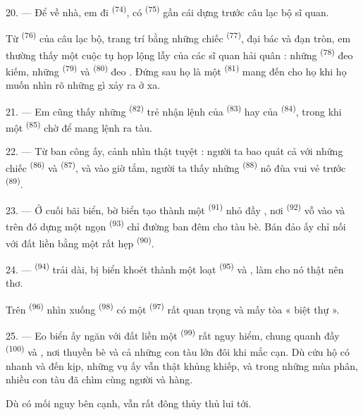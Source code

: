 \VUsaut{3.0mm}
\VUsaut{3.0mm}

20. --- Để về nhà, em đi  \textsuperscript{(74)}, có 
\textsuperscript{(75)} gần cái  dựng trước câu lạc bộ sĩ quan.

Từ  \textsuperscript{(76)} của câu lạc bộ, trang trí bằng những chiếc
 \textsuperscript{(77)}, đại bác và đạn tròn, em thường thấy một cuộc tụ
họp lộng lẫy của các sĩ quan hải quân : những 
\textsuperscript{(78)} đeo kiếm, những 
\textsuperscript{(79)} và  \textsuperscript{(80)} đeo .
Đứng sau họ là một  \textsuperscript{(81)} mang  đến
cho họ khi họ muốn nhìn rõ những gì xảy ra ở xa.

21. --- Em cũng thấy những  \textsuperscript{(82)} trẻ nhận lệnh của
 \textsuperscript{(83)} hay của 
\textsuperscript{(84)}, trong khi một  \textsuperscript{(85)} chờ để
mang lệnh ra tàu.

22. --- Từ ban công ấy, cảnh nhìn thật tuyệt : người ta bao quát cả 
với những chiếc  \textsuperscript{(86)} và 
\textsuperscript{(87)}, và vào giờ tắm, người ta thấy những 
\textsuperscript{(88)} nô đùa vui vẻ trước  \textsuperscript{(89)}.

23. --- Ở cuối bãi biển, bờ biển tạo thành một 
\textsuperscript{(91)} nhỏ đầy , nơi  \textsuperscript{(92)}
vỗ vào và trên đó dựng một ngọn  \textsuperscript{(93)} chỉ đường ban
đêm cho tàu bè. Bán đảo ấy chỉ nối với đất liền bằng một  rất hẹp
\textsuperscript{(90)}.

\VUsaut{3.0mm}
\VUsaut{3.0mm}

24. ---  \textsuperscript{(94)} trải dài, bị biển khoét thành một loạt
 \textsuperscript{(95)} và , làm cho nó thật nên thơ.

Trên  \textsuperscript{(96)} nhìn xuống 
\textsuperscript{(98)} có một  \textsuperscript{(97)} rất quan trọng và
mấy tòa « biệt thự ».

25. --- Eo biển ấy ngăn với đất liền một  \textsuperscript{(99)} rất
nguy hiểm, chung quanh đầy  \textsuperscript{(100)} và , nơi thuyền bè và cả những con tàu lớn đôi khi mắc cạn. Dù cứu hộ có nhanh và
 đến kịp, những vụ  ấy vẫn thật khủng khiếp, và
trong những  mùa phân, nhiều con tàu đã chìm cùng người và hàng.

Dù có mối nguy bên cạnh,  vẫn rất đông thủy thủ lui tới.
\VUsaut{6.0mm}
\VUfilet{22mm}
